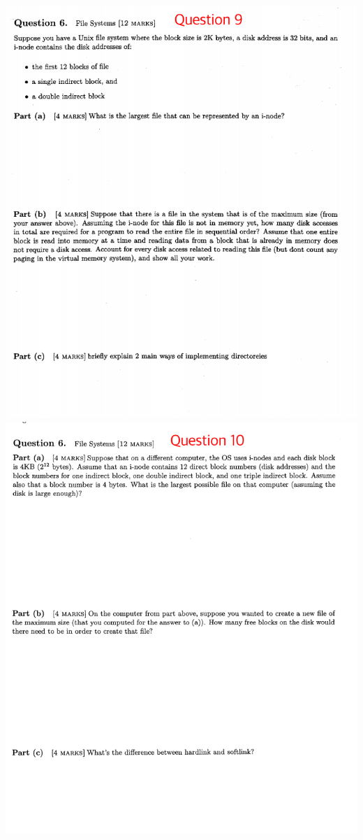 \documentclass[12pt]{article}
\begin{document}
\begin{center}
\includegraphics[width=\linewidth]{../images/midterm_4_15.png}
\includegraphics[width=\linewidth]{../images/midterm_4_16.png}
\end{center}
\end{document}
